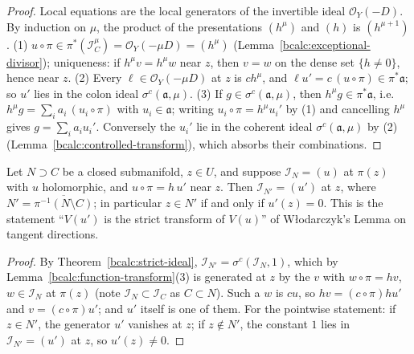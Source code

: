 \begin{proof}
\mixedleanok
Local equations are the local generators of the invertible ideal \(\mathcal O_Y(-D)\). By induction on \(\mu\), the product of the
presentations \((h^{\mu})\) and \((h)\) is \((h^{\mu+1})\). (1) \(u\circ\pi\in\pi^*(\mathcal I_C^{\mu})=\mathcal O_Y(-\mu D)=(h^{\mu})\)
(Lemma~\ref{bcalc:exceptional-divisor}); uniqueness: if \(h^{\mu}v=h^{\mu}w\) near \(z\), then \(v=w\) on the dense set \(\{h\ne0\}\), hence near
\(z\). (2) Every \(\ell\in\mathcal O_Y(-\mu D)\) at \(z\) is \(ch^{\mu}\), and \(\ell u'=c\,(u\circ\pi)\in\pi^*\mathfrak a\); so \(u'\) lies in the colon ideal
\(\sigma^{c}(\mathfrak a,\mu)\). (3) If \(g\in\sigma^{c}(\mathfrak a,\mu)\), then \(h^{\mu}g\in\pi^*\mathfrak a\), i.e.\ \(h^{\mu}g=\sum_ia_i\,(u_i\circ\pi)\) with
\(u_i\in\mathfrak a\); writing \(u_i\circ\pi=h^{\mu}u_i'\) by (1) and cancelling \(h^{\mu}\) gives \(g=\sum_ia_iu_i'\). Conversely the \(u_i'\) lie in the
coherent ideal \(\sigma^{c}(\mathfrak a,\mu)\) by (2) (Lemma~\ref{bcalc:controlled-transform}), which absorbs their combinations.
\end{proof}

\begin{corollary}
\label{bcalc:giraud-strict}
\upstreamleanok
Let \(N\supset C\) be a closed submanifold, \(z\in U\), and suppose \(\mathcal I_N=(u)\) at \(\pi(z)\) with \(u\) holomorphic, and
\(u\circ\pi=h\,u'\) near \(z\). Then \(\mathcal I_{N'}=(u')\) at \(z\), where \(N'=\overline{\pi^{-1}(N\setminus C)}\); in particular \(z\in N'\) if and only
if \(u'(z)=0\). This is the statement ``\(V(u')\) is the strict transform of \(V(u)\)'' of Włodarczyk's Lemma on tangent directions.
\end{corollary}
\begin{proof}
\upstreamleanok
By Theorem~\ref{bcalc:strict-ideal}, \(\mathcal I_{N'}=\sigma^{c}(\mathcal I_N,1)\), which by Lemma~\ref{bcalc:function-transform}(3) is generated at \(z\) by the
\(v\) with \(w\circ\pi=hv\), \(w\in\mathcal I_N\) at \(\pi(z)\) (note \(\mathcal I_N\subset\mathcal I_C\) as \(C\subset N\)). Such a \(w\) is \(cu\), so
\(hv=(c\circ\pi)hu'\) and \(v=(c\circ\pi)u'\); and \(u'\) itself is one of them. For the pointwise statement: if \(z\in N'\), the generator \(u'\)
vanishes at \(z\); if \(z\notin N'\), the constant \(1\) lies in \(\mathcal I_{N'}=(u')\) at \(z\), so \(u'(z)\ne0\).
\end{proof}

